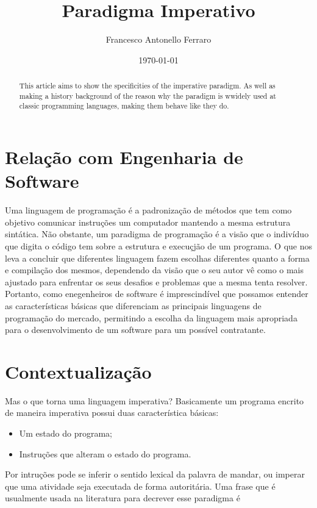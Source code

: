 \documentclass[11pt]{article}
\author{Francesco Antonello Ferraro}
\date{\today}
\title{Paradigma Imperativo}
\begin{document}
\maketitle
\begin{abstract}
This article aims to show the specificities of the imperative paradigm. As well as making a history background of the reason why the paradigm is wwidely used at classic programming languages, making them behave like they do.
\end{abstract}

\section{Relação com Engenharia de Software}
\label{sec:orgf4ba8e6}

Uma linguagem de programação é a padronização de métodos que tem como objetivo comunicar instruções um computador mantendo a mesma estrutura sintática. Não obstante, um paradigma de programação é a visão que o indivíduo que digita o código tem sobre a estrutura e execuçjão de um programa. O que nos leva a concluir que diferentes linguagem fazem escolhas diferentes quanto a forma e compilação dos mesmos, dependendo da visão que o seu autor vê como o mais ajustado para enfrentar os seus desafios e problemas que a mesma tenta resolver. Portanto, como enegenheiros de software é imprescindível que possamos entender as características básicas que diferenciam as principais linguagens de programação do mercado, permitindo a escolha da linguagem mais apropriada para o desenvolvimento de um software para um possível contratante.

\section{Contextualização}
\label{sec:org844b0c9}

Mas o que torna uma linguagem imperativa? Basicamente um programa encrito de maneira imperativa possui duas característica básicas:

\begin{itemize}
\item Um estado do programa;
\item Instruções que alteram o estado do programa.
\end{itemize}

Por intruções pode se inferir o sentido lexical da palavra de mandar, ou imperar que uma atividade seja executada de forma autoritária. Uma frase que é usualmente  usada na literatura para decrever esse paradigma é
\end{document}
